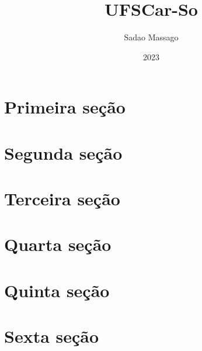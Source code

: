 \documentclass[a4paper,12pt]{leaflet}
\title{
 \textbf{UFSCar-So}}
\author{Sadao Massago}
\date{2023}
\begin{document}
\maketitle

\section{Primeira seção}
\lipsum[5]
\section{Segunda seção}
\lipsum[1-2]
\section{Terceira seção}
\lipsum[3-4]
\section{Quarta seção}
\lipsum[1-2]
\section{Quinta seção}
\lipsum[4]
\section{Sexta seção}
\lipsum[1-3]
\end{document}
